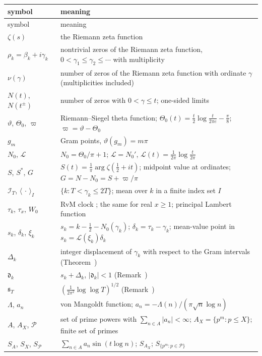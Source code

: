 \documentclass[preprint,12pt]{elsarticle}
\makeatletter
\let\CG@origref\ref
\let\CG@origeqref\eqref
\newcommand{\CG@gettip}[1]{\@ifundefined{CGTip@#1}{Reference: #1}{\csname CGTip@#1\endcsname}}
\DeclareRobustCommand{\CGref}[1]{\pdftooltip{\CG@origref{#1}}{\CG@gettip{#1}}}
\DeclareRobustCommand{\CGeqref}[1]{\pdftooltip{\CG@origeqref{#1}}{\CG@gettip{#1}}}
\numberwithin{equation}{section}
\theoremstyle{plain}
\theoremstyle{definition}
\theoremstyle{remark}
\newcommand{\NO}{N_0}
\newcommand{\lL}{\mathcal L}
\newcommand{\IT}{\mathcal I_T}
\newcommand{\PP}{\mathcal P}
\makeatother
\begin{document}
\begin{center}
\small
\begin{longtable}{p{}p{}}
\toprule
symbol & meaning\\
\midrule
\endfirsthead
\toprule
symbol & meaning\\
\midrule
\endhead
\bottomrule
\endfoot
$\zeta(s)$ & the Riemann zeta function\\
$\rho_k=\beta_k+i\gamma_k$ & nontrivial zeros of the Riemann zeta function, $0<\gamma_1\le\gamma_2\le\cdots$ with multiplicity\\
$\nu(\gamma)$ & number of zeros of the Riemann zeta function with ordinate $\gamma$ (multiplicities included)\\
$N(t)$, $N(t^\pm)$ & number of zeros with $0<\gamma\le t$; one-sided limits\\
$\vartheta$, $\Theta_0$, $\varpi$ & Riemann--Siegel theta function; $\Theta_0(t)=\frac t2\log\frac t{2\pi e}-\frac\pi8$; $\varpi=\vartheta-\Theta_0$\\
$g_m$ & Gram points, $\vartheta(g_m)=m\pi$\\
$\NO$, $\lL$ & $\NO=\Theta_0/\pi+1$; $\lL=\NO'$, $\lL(t)=\frac1{2\pi}\log\frac t{2\pi}$\\
$S$, $S^*$, $G$ & $S(t)=\frac1\pi\arg\zeta(\frac12+it)$; midpoint value at ordinates; $G=N-\NO=S+\varpi/\pi$\\
$\IT$, $\langle\,\cdot\,\rangle_I$ & $\{k:T<\gamma_k\le2T\}$; mean over $k$ in a finite index set $I$\\
$\tau_k$, $\tau_x$, $W_0$ & RvM clock \CGeqref{eq:clock}; the same for real $x\ge1$; principal Lambert function\\
$s_k$, $\delta_k$, $\xi_k$ & $s_k=k-\frac12-\NO(\gamma_k)$; $\delta_k=\tau_k-\gamma_k$; mean-value point in $s_k=\lL(\xi_k)\delta_k$\\
$\Delta_k$ & integer displacement of $\gamma_k$ with respect to the Gram intervals (Theorem~\CGref{thm:known_korolev})\\
$\mathfrak d_k$ & $s_k+\Delta_k$, $|\mathfrak d_k|<1$ (Remark~\CGref{rem:korolev})\\
$\mathfrak s_T$ & $(\frac1{2\pi^2}\log\log T)^{1/2}$ (Remark~\CGref{rem:korolev})\\
$\Lambda$, $a_n$ & von Mangoldt function; $a_n=-\Lambda(n)/(\pi\sqrt n\log n)$\\
$A$, $A_X$, $\PP$ & set of prime powers with $\sum_{n\in A}|a_n|<\infty$; $A_X=\{p^m:p\le X\}$; finite set of primes\\
$S_A$, $S_X$, $S_\PP$ & $\sum_{n\in A}a_n\sin(t\log n)$; $S_{A_X}$; $S_{\{p^m:p\in\PP\}}$\\

\end{longtable}
\end{center}
\end{document}
